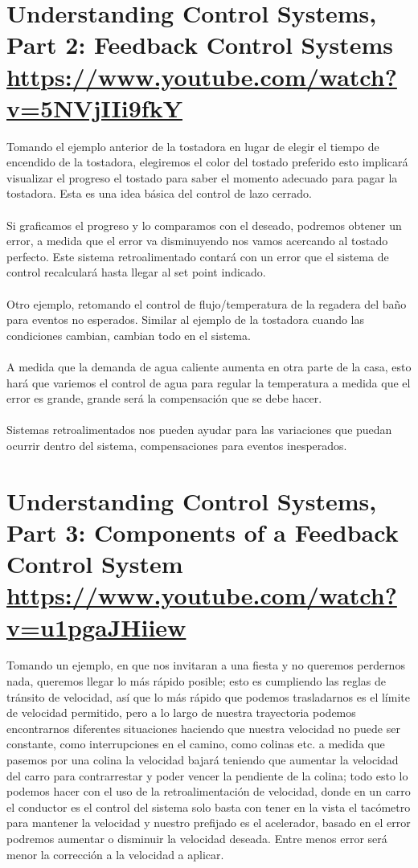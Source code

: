 \documentclass[
	12pt, %
]{fphw}
\begin{document}
\newpage
\section*{{\color{Cerulean}Understanding Control Systems, Part 2: Feedback Control Systems} \url{https://www.youtube.com/watch?v=5NVjIIi9fkY}}

Tomando el ejemplo anterior de la tostadora en lugar de elegir el tiempo de encendido de la tostadora, elegiremos el color del tostado preferido esto implicará visualizar el progreso el tostado para saber el momento adecuado para pagar la tostadora. Esta es una idea básica del control de lazo cerrado. \\\\
Si graficamos el progreso y lo comparamos con el deseado, podremos obtener un error, a medida que el error va disminuyendo nos vamos acercando al tostado perfecto. Este sistema retroalimentado contará con un error que el sistema de control recalculará hasta llegar al set point indicado. \\\\
Otro ejemplo, retomando el control de flujo/temperatura de la regadera del baño para eventos no esperados. Similar al ejemplo de la tostadora cuando las condiciones cambian, cambian todo en el sistema. \\ \\
A medida que la demanda de agua caliente aumenta en otra parte de la casa, esto hará que variemos el control de agua para regular la temperatura a medida que el error es grande, grande será la compensación que se debe hacer. \\\\
Sistemas retroalimentados nos pueden ayudar para las variaciones que puedan ocurrir dentro del sistema, compensaciones para eventos inesperados.

\newpage
\section*{{\color{RoyalPurple}Understanding Control Systems, Part 3: Components of a Feedback Control System} \url{https://www.youtube.com/watch?v=u1pgaJHiiew}}

Tomando un ejemplo, en que nos invitaran a una fiesta y no queremos perdernos nada, queremos llegar lo más rápido posible; esto es cumpliendo las reglas de tránsito de velocidad, así que lo más rápido que podemos trasladarnos es el límite de velocidad permitido, pero a lo largo de nuestra trayectoria podemos encontrarnos diferentes situaciones haciendo que nuestra velocidad no puede ser constante, como interrupciones en el camino, como colinas etc.  a medida que pasemos por una colina la velocidad bajará teniendo que aumentar la velocidad del carro para contrarrestar y poder vencer la pendiente de la colina; todo esto lo podemos hacer con el uso de la retroalimentación de velocidad, donde en un carro el conductor es el control del sistema solo basta con tener en la vista el tacómetro para mantener la velocidad y nuestro prefijado es el acelerador, basado en el error podremos aumentar o disminuir la velocidad deseada. Entre menos error será menor la corrección a la velocidad a aplicar. \\\\
\end{document}
